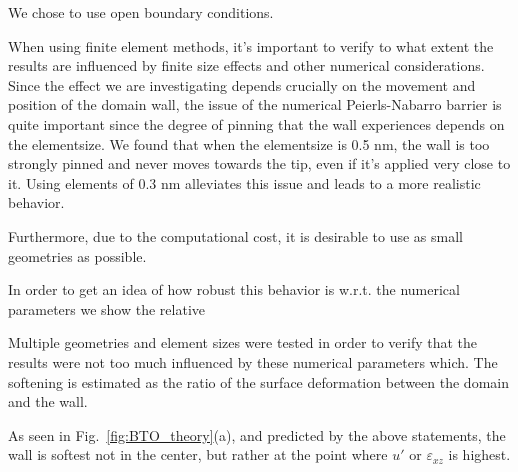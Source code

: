 We chose to use open boundary conditions.

When using finite element methods, it's important to verify to what extent the results are influenced by finite size effects and other numerical considerations.
Since the effect we are investigating depends crucially on the movement and position of the domain wall, the issue of the numerical Peierls-Nabarro barrier \cite{Marton2018} is quite important since the degree of pinning that the wall experiences depends on the elementsize.
We found that when the elementsize is 0.5 nm, the wall is too strongly pinned and never moves towards the tip, even if it's applied very close to it.
Using elements of 0.3 nm alleviates this issue and leads to a more realistic behavior.


Furthermore, due to the computational cost, it is desirable to use as small geometries as possible.

In order to get an idea of how robust this behavior is w.r.t. the numerical parameters we show the relative 

Multiple geometries and element sizes were tested in order to verify that the results were not too much influenced by these numerical parameters which. 
The softening is estimated as the ratio of the surface deformation between the domain and the wall.

As seen in Fig.~\ref{fig:BTO_theory}(a), and predicted by the above statements, the wall is softest not in the center, but rather at the point where $u'$ or $\varepsilon_{xz}$ is highest.

\printbibliography
